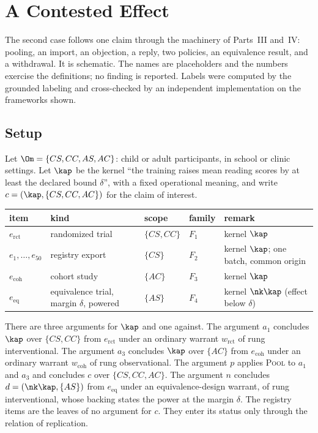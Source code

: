 \chapter{A Contested Effect}\label{ch:effect}

The second case follows one claim through the machinery of Parts~III and~IV: pooling, an import, an objection, a reply, two policies, an equivalence result, and a withdrawal. It is schematic. The names are placeholders and the numbers exercise the definitions; no finding is reported. Labels were computed by the grounded labeling and cross-checked by an independent implementation on the frameworks shown.

\section{Setup}\label{sec:case2setup}

Let $\Om=\{CS,CC,AS,AC\}$: child or adult participants, in school or clinic settings. Let $\kap$ be the kernel ``the training raises mean reading scores by at least the declared bound $\delta$'', with a fixed operational meaning, and write $c=(\kap,\{CS,CC,AC\})$ for the claim of interest.

\begin{center}
\small
\begin{tabularx}{\textwidth}{@{}l l l l X@{}}
\toprule
item & kind & scope & family & remark\\
\midrule
$e_{\mathrm{rct}}$ & randomized trial & $\{CS,CC\}$ & $F_1$ & kernel $\kap$\\
$e_1,\dots,e_{50}$ & registry export & $\{CS\}$ & $F_2$ & kernel $\kap$; one batch, common origin\\
$e_{\mathrm{coh}}$ & cohort study & $\{AC\}$ & $F_3$ & kernel $\kap$\\
$e_{\mathrm{eq}}$ & equivalence trial, margin $\delta$, powered & $\{AS\}$ & $F_4$ & kernel $\nk\kap$ (effect below $\delta$)\\
\bottomrule
\end{tabularx}
\end{center}

There are three arguments for $\kap$ and one against. The argument $a_1$ concludes $\kap$ over $\{CS,CC\}$ from $e_{\mathrm{rct}}$ under an ordinary warrant $w_{\mathrm{rct}}$ of rung \textsf{interventional}. The argument $a_3$ concludes $\kap$ over $\{AC\}$ from $e_{\mathrm{coh}}$ under an ordinary warrant $w_{\mathrm{coh}}$ of rung \textsf{observational}. The argument $p$ applies \textsc{Pool} to $a_1$ and $a_3$ and concludes $c$ over $\{CS,CC,AC\}$. The argument $n$ concludes $d=(\nk\kap,\{AS\})$ from $e_{\mathrm{eq}}$ under an equivalence-design warrant, of rung \textsf{interventional}, whose backing states the power at the margin $\delta$. The registry items are the leaves of no argument for $c$. They enter its status only through the relation of replication.


